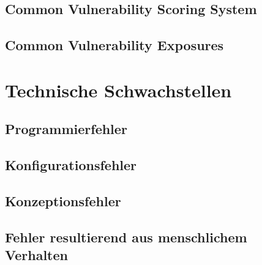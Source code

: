 \subsection{Common Vulnerability Scoring System}

\subsection{Common Vulnerability Exposures}

\section{Technische Schwachstellen}

\subsection{Programmierfehler}

\subsection{Konfigurationsfehler}

\subsection{Konzeptionsfehler}

\subsection{Fehler resultierend aus menschlichem Verhalten}